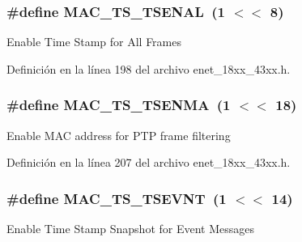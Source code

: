 \subsubsection[{\texorpdfstring{M\+A\+C\+\_\+\+T\+S\+\_\+\+T\+S\+E\+N\+AL}{MAC_TS_TSENAL}}]{\setlength{\rightskip}{0pt plus 5cm}\#define M\+A\+C\+\_\+\+T\+S\+\_\+\+T\+S\+E\+N\+AL~(1 $<$$<$ 8)}\hypertarget{group___e_n_e_t__18_x_x__43_x_x_gaf061b478b8358fe04a28632ae35cd985}{}\label{group___e_n_e_t__18_x_x__43_x_x_gaf061b478b8358fe04a28632ae35cd985}
Enable Time Stamp for All Frames 

Definición en la línea 198 del archivo enet\+\_\+18xx\+\_\+43xx.\+h.

\subsubsection[{\texorpdfstring{M\+A\+C\+\_\+\+T\+S\+\_\+\+T\+S\+E\+N\+MA}{MAC_TS_TSENMA}}]{\setlength{\rightskip}{0pt plus 5cm}\#define M\+A\+C\+\_\+\+T\+S\+\_\+\+T\+S\+E\+N\+MA~(1 $<$$<$ 18)}\hypertarget{group___e_n_e_t__18_x_x__43_x_x_ga1f77fb29e14ee9afbeba6853544d11a1}{}\label{group___e_n_e_t__18_x_x__43_x_x_ga1f77fb29e14ee9afbeba6853544d11a1}
Enable M\+AC address for P\+TP frame filtering 

Definición en la línea 207 del archivo enet\+\_\+18xx\+\_\+43xx.\+h.

\subsubsection[{\texorpdfstring{M\+A\+C\+\_\+\+T\+S\+\_\+\+T\+S\+E\+V\+NT}{MAC_TS_TSEVNT}}]{\setlength{\rightskip}{0pt plus 5cm}\#define M\+A\+C\+\_\+\+T\+S\+\_\+\+T\+S\+E\+V\+NT~(1 $<$$<$ 14)}\hypertarget{group___e_n_e_t__18_x_x__43_x_x_gadfd9c1cdc1fa5bd911e449463017a12e}{}\label{group___e_n_e_t__18_x_x__43_x_x_gadfd9c1cdc1fa5bd911e449463017a12e}
Enable Time Stamp Snapshot for Event Messages 

